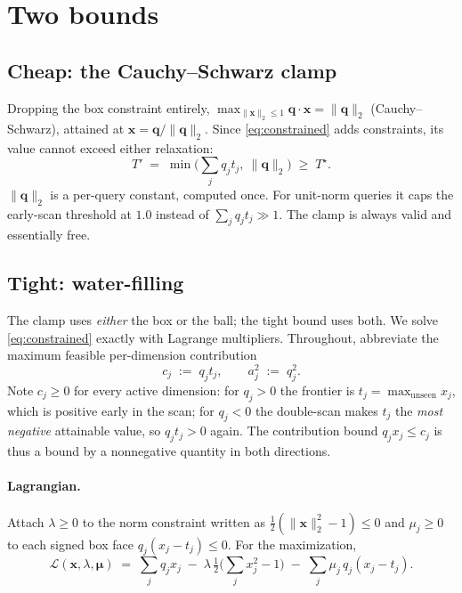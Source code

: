 \documentclass[11pt,a4paper]{article}
\newcommand{\qv}{\mathbf{q}}
\newcommand{\xv}{\mathbf{x}}
\newcommand{\norm}[1]{\lVert #1 \rVert}
\begin{document}
\section{Two bounds}

\subsection{Cheap: the Cauchy--Schwarz clamp}

Dropping the box constraint entirely,
$\max_{\norm{\xv}_2\le1}\qv\cdot\xv=\norm{\qv}_2$ (Cauchy--Schwarz), attained at
$\xv=\qv/\norm{\qv}_2$. Since \eqref{eq:constrained} adds constraints, its value
cannot exceed either relaxation:
\begin{equation}
  T' \;=\; \min\!\Big(\textstyle\sum_j q_j t_j,\ \norm{\qv}_2\Big)
  \;\ge\; T^\star .
  \label{eq:clamp}
\end{equation}
$\norm{\qv}_2$ is a per-query constant, computed once. For unit-norm queries it
caps the early-scan threshold at $1.0$ instead of $\sum_j q_j t_j\gg1$. The
clamp is always valid and essentially free.

\subsection{Tight: water-filling}

The clamp uses \emph{either} the box or the ball; the tight bound uses both. We
solve \eqref{eq:constrained} exactly with Lagrange multipliers. Throughout,
abbreviate the maximum feasible per-dimension contribution
\begin{equation}
  c_j \;:=\; q_j t_j, \qquad a_j^2 \;:=\; q_j^2 .
\end{equation}
Note $c_j\ge0$ for every active dimension: for $q_j>0$ the frontier is
$t_j = \max_{\text{unseen}} x_j$, which is positive early in the scan; for
$q_j<0$ the double-scan makes $t_j$ the \emph{most negative} attainable value, so
$q_j t_j>0$ again. The contribution bound $q_j x_j\le c_j$ is thus a bound by a
nonnegative quantity in both directions.

\paragraph{Lagrangian.} Attach $\lambda\ge0$ to the norm constraint written as
$\tfrac12(\norm{\xv}_2^2-1)\le0$ and $\mu_j\ge0$ to each signed box face
$q_j(x_j-t_j)\le0$. For the maximization,
\begin{equation}
  \mathcal{L}(\xv,\lambda,\bm{\mu})
  \;=\; \sum_j q_j x_j
  \;-\; \lambda\,\tfrac12\!\Big(\sum_j x_j^2 - 1\Big)
  \;-\; \sum_j \mu_j\, q_j (x_j - t_j).
  \label{eq:lagrangian}
\end{equation}
\end{document}
